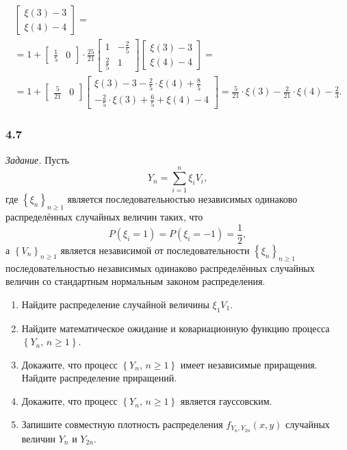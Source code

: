\begin{enumerate}[label=\alph*)]
\begin{gather*}
\begin{bmatrix}
      \xi \left( 3 \right) - 3 \\
      \xi \left( 4 \right) - 4
    \end{bmatrix} = \\
    = 1 +
    \begin{bmatrix}
      \frac{1}{5} & 0
    \end{bmatrix} \cdot \frac{25}{21}
    \begin{bmatrix}
      1 & -\frac{2}{5} \\
      \frac{2}{5} & 1
    \end{bmatrix}
    \begin{bmatrix}
      \xi \left( 3 \right) - 3 \\
      \xi \left( 4 \right) - 4
    \end{bmatrix} = \\
    = 1 +
    \begin{bmatrix}
      \frac{5}{21} & 0
    \end{bmatrix}
    \begin{bmatrix}
      \xi \left( 3 \right) - 3 - \frac{2}{5} \cdot \xi \left( 4 \right) + \frac{8}{5} \\
      -\frac{2}{5} \cdot \xi \left( 3 \right) + \frac{6}{5} + \xi \left( 4 \right) - 4
    \end{bmatrix} =
    \frac{5}{21} \cdot \xi \left( 3 \right) - \frac{2}{21} \cdot \xi \left( 4 \right) -
    \frac{2}{3}.
  \end{gather*}
\end{enumerate}

\subsubsection*{4.7}

\textit{Задание.}
Пусть
$$Y_n =
  \sum \limits_{i = 1}^n \xi_i V_i,$$
где $ \left\{ \xi_n \right\}_{n \geq 1}$
является последовательностью независимых одинаково распределённых случайных величин таких, что
$$P \left( \xi_i = 1 \right) =
  P \left( \xi_i = -1 \right) =
  \frac{1}{2},$$
а $ \left\{ V_n \right\}_{n \geq 1}$ является независимой от последовательности
$ \left\{ \xi_n \right\}_{n \geq 1}$
последовательностью независимых одинаково
распределённых случайных величин со стандартным нормальным законом распределения.
\begin{enumerate}[label=\alph*)]
  \item Найдите распределение случайной величины $ \xi_1 V_1$.
  \item Найдите математическое ожидание и ковариационную функцию процесса
  $ \left\{ Y_n, \, n \geq 1 \right\} $.
  \item Докажите, что процесс $ \left\{ Y_n, \, n \geq 1 \right\} $ имеет независимые приращения.
  Найдите распределение приращений.
  \item Докажите, что процесс $ \left\{ Y_n, \, n \geq 1 \right\} $ является гауссовским.
  \item Запишите совместную плотность распределения $f_{Y_n, Y_{2n}} \left( x, y \right) $
  случайных величин $Y_n$ и $Y_{2n}$.
\end{enumerate}

